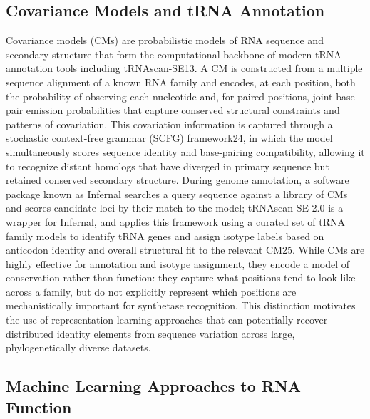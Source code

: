 \documentclass{article}
\begin{document}
\subsection{Covariance Models and tRNA Annotation}

Covariance models (CMs) are probabilistic models of RNA sequence and secondary structure that form the computational backbone of modern tRNA annotation tools including tRNAscan-SE13. A CM is constructed from a multiple sequence alignment of a known RNA family and encodes, at each position, both the probability of observing each nucleotide and, for paired positions, joint base-pair emission probabilities that capture conserved structural constraints and patterns of covariation. This covariation information is captured through a stochastic context-free grammar (SCFG) framework24, in which the model simultaneously scores sequence identity and base-pairing compatibility, allowing it to recognize distant homologs that have diverged in primary sequence but retained conserved secondary structure. During genome annotation, a software package known as Infernal searches a query sequence against a library of CMs and scores candidate loci by their match to the model; tRNAscan-SE 2.0 is a wrapper for Infernal, and applies this framework using a curated set of tRNA family models to identify tRNA genes and assign isotype labels based on anticodon identity and overall structural fit to the relevant CM25.
While CMs are highly effective for annotation and isotype assignment, they encode a model of conservation rather than function: they capture what positions tend to look like across a family, but do not explicitly represent which positions are mechanistically important for synthetase recognition. This distinction motivates the use of representation learning approaches that can potentially recover distributed identity elements from sequence variation across large, phylogenetically diverse datasets.

\subsection{Machine Learning Approaches to RNA Function}
\end{document}
